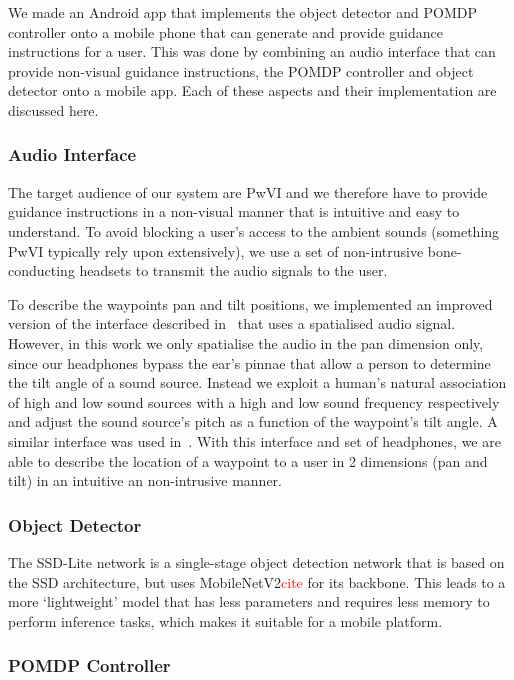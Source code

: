 \documentclass[runningheads]{llncs}
\newcommand\todo[1]{\textcolor{red}{#1}}
\begin{document}
We made an Android app that implements the object detector and POMDP controller onto a mobile phone that can generate and provide guidance instructions for a user.  
This was done by combining an audio interface that can provide non-visual guidance instructions, the POMDP controller and object detector onto a mobile app.
Each of these aspects and their implementation are discussed here.

\subsubsection{Audio Interface}

The target audience of our system are PwVI and we therefore have to provide guidance instructions in a non-visual manner that is intuitive and easy to understand. 
To avoid blocking a user's access to the ambient sounds (something PwVI typically rely upon extensively), we use a set of non-intrusive bone-conducting headsets to transmit the audio signals to the user. 

To describe the waypoints pan and tilt positions, we implemented an improved version of the interface described in~\cite{bellotto2013} that uses a spatialised audio signal.
However, in this work we only spatialise the audio in the pan dimension only, since our headphones bypass the ear's pinnae that allow a person to determine the tilt angle of a sound source. 
Instead we exploit a human's natural association of high and low sound sources with a high and low sound frequency respectively~\cite{blauert1997spatial} and adjust the sound source's pitch as a function of the waypoint's tilt angle. 
A similar interface was used in~\cite{schauerte2012assistive}.
With this interface and set of headphones, we are able to describe the location of a waypoint to a user in 2 dimensions (pan and tilt) in an intuitive an non-intrusive manner. 

\subsubsection{Object Detector}

The SSD-Lite network is a single-stage object detection network that is based on the SSD architecture, but uses MobileNetV2\todo{cite} for its backbone.
This leads to a more `lightweight' model that has less parameters and requires less memory to perform inference tasks, which makes it suitable for a mobile platform. 

\subsubsection{POMDP Controller}
\end{document}

